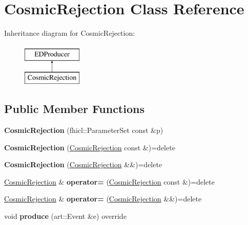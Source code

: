 \hypertarget{classCosmicRejection}{}\section{Cosmic\+Rejection Class Reference}
\label{classCosmicRejection}
Inheritance diagram for Cosmic\+Rejection\+:\begin{figure}[H]
\begin{center}
\leavevmode
\includegraphics[height=2.000000cm]{classCosmicRejection}
\end{center}
\end{figure}
\subsection*{Public Member Functions}
\begin{DoxyCompactItemize}
\item 
{\bfseries Cosmic\+Rejection} (fhicl\+::\+Parameter\+Set const \&p)\hypertarget{classCosmicRejection_a7663d784ec40b8a3ba79b76b775118c7}{}\label{classCosmicRejection_a7663d784ec40b8a3ba79b76b775118c7}

\item 
{\bfseries Cosmic\+Rejection} (\hyperlink{classCosmicRejection}{Cosmic\+Rejection} const \&)=delete\hypertarget{classCosmicRejection_aa06f3640dbccac91b299101b712bbe97}{}\label{classCosmicRejection_aa06f3640dbccac91b299101b712bbe97}

\item 
{\bfseries Cosmic\+Rejection} (\hyperlink{classCosmicRejection}{Cosmic\+Rejection} \&\&)=delete\hypertarget{classCosmicRejection_a391a622a1cfb9b03d3298d046e850f63}{}\label{classCosmicRejection_a391a622a1cfb9b03d3298d046e850f63}

\item 
\hyperlink{classCosmicRejection}{Cosmic\+Rejection} \& {\bfseries operator=} (\hyperlink{classCosmicRejection}{Cosmic\+Rejection} const \&)=delete\hypertarget{classCosmicRejection_a49fdc618e61833a84f5f548a16dab324}{}\label{classCosmicRejection_a49fdc618e61833a84f5f548a16dab324}

\item 
\hyperlink{classCosmicRejection}{Cosmic\+Rejection} \& {\bfseries operator=} (\hyperlink{classCosmicRejection}{Cosmic\+Rejection} \&\&)=delete\hypertarget{classCosmicRejection_a07294b34f21bfa92ece444820e96faac}{}\label{classCosmicRejection_a07294b34f21bfa92ece444820e96faac}

\item 
void {\bfseries produce} (art\+::\+Event \&e) override\hypertarget{classCosmicRejection_a5275aff5d81db9b43574ea13d1f15d12}{}\label{classCosmicRejection_a5275aff5d81db9b43574ea13d1f15d12}

\end{DoxyCompactItemize}
